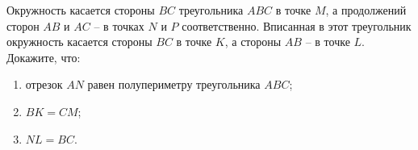 \begin{ex}
	\begin{condition}
		Окружность касается стороны \( BC  \) треугольника \( ABC  \) в точке \( M  \), а продолжений сторон \( AB  \) и \( AC \) – в точках \( N \) и \( P  \) соответственно. Вписанная в этот треугольник окружность касается стороны \( BC  \) в точке \( K \), а стороны \( AB \) – в точке \( L \). Докажите, что: 
		\begin{enumerate}
			\item отрезок \( AN  \) равен полупериметру треугольника \( ABC \);
			\item \( BK = CM \);
			\item \( NL = BC \).
		\end{enumerate}  
	\end{condition}
\end{ex}